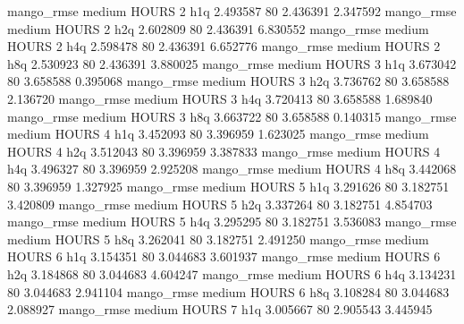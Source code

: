        mango_rmse     medium    HOURS                 2                  h1q  2.493587 80       2.436391           2.347592
       mango_rmse     medium    HOURS                 2                  h2q  2.602809 80       2.436391           6.830552
       mango_rmse     medium    HOURS                 2                  h4q  2.598478 80       2.436391           6.652776
       mango_rmse     medium    HOURS                 2                  h8q  2.530923 80       2.436391           3.880025
       mango_rmse     medium    HOURS                 3                  h1q  3.673042 80       3.658588           0.395068
       mango_rmse     medium    HOURS                 3                  h2q  3.736762 80       3.658588           2.136720
       mango_rmse     medium    HOURS                 3                  h4q  3.720413 80       3.658588           1.689840
       mango_rmse     medium    HOURS                 3                  h8q  3.663722 80       3.658588           0.140315
       mango_rmse     medium    HOURS                 4                  h1q  3.452093 80       3.396959           1.623025
       mango_rmse     medium    HOURS                 4                  h2q  3.512043 80       3.396959           3.387833
       mango_rmse     medium    HOURS                 4                  h4q  3.496327 80       3.396959           2.925208
       mango_rmse     medium    HOURS                 4                  h8q  3.442068 80       3.396959           1.327925
       mango_rmse     medium    HOURS                 5                  h1q  3.291626 80       3.182751           3.420809
       mango_rmse     medium    HOURS                 5                  h2q  3.337264 80       3.182751           4.854703
       mango_rmse     medium    HOURS                 5                  h4q  3.295295 80       3.182751           3.536083
       mango_rmse     medium    HOURS                 5                  h8q  3.262041 80       3.182751           2.491250
       mango_rmse     medium    HOURS                 6                  h1q  3.154351 80       3.044683           3.601937
       mango_rmse     medium    HOURS                 6                  h2q  3.184868 80       3.044683           4.604247
       mango_rmse     medium    HOURS                 6                  h4q  3.134231 80       3.044683           2.941104
       mango_rmse     medium    HOURS                 6                  h8q  3.108284 80       3.044683           2.088927
       mango_rmse     medium    HOURS                 7                  h1q  3.005667 80       2.905543           3.445945
